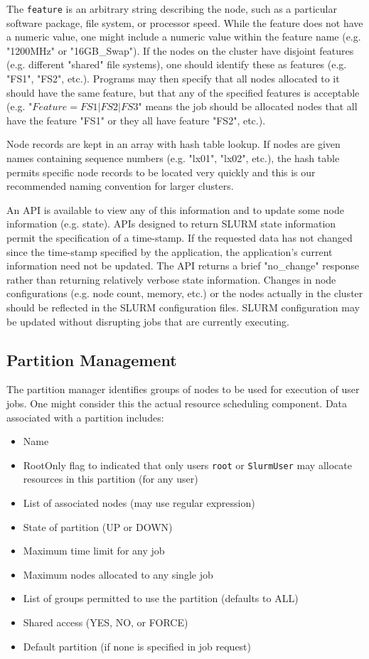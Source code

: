 The {\tt feature} is an arbitrary string describing the node, such as
a particular software package, file system, or processor speed.
While the feature does not have a numeric value, one might include a
numeric value within the feature name (e.g. "1200MHz" or "16GB\_Swap").
If the nodes on the cluster have disjoint features (e.g. different
"shared" file systems), one should identify these as features (e.g. "FS1",
"FS2", etc.).  Programs may then specify that all nodes allocated to it
should have the same feature, but that any of the specified features is
acceptable (e.g. "$Feature=FS1|FS2|FS3$" means the job should be allocated 
nodes that all have the feature "FS1" or they all have feature "FS2", etc.).

Node records are kept in an array with hash table lookup. 
If nodes are given names containing sequence numbers (e.g. "lx01", "lx02", 
etc.), the hash table permits specific node records to be located 
very quickly and this is our recommended naming convention for larger 
clusters.

An API is available to view any of this information and to update some 
node information (e.g. state). APIs designed to return SLURM
state information permit the specification of a time-stamp.  If the
requested data has not changed since the time-stamp specified by the
application, the application's current information need not be updated.
The API returns a brief "no\_change" response rather than returning
relatively verbose state information.
Changes in node configurations (e.g. node count, memory, etc.) or the nodes 
actually in the cluster should be reflected in the SLURM configuration 
files. SLURM configuration may be updated without disrupting jobs 
that are currently executing.

\subsection{Partition Management}

The partition manager identifies groups of nodes to be used for
execution of user jobs. One might consider this the actual resource 
scheduling component. 
Data associated with a partition includes:
\begin{itemize}
\item Name
\item RootOnly flag to indicated that only users {\tt root} or 
{\tt SlurmUser} may allocate resources in this partition (for any user)
\item List of associated nodes (may use regular expression)
\item State of partition (UP or DOWN)
\item Maximum time limit for any job
\item Maximum nodes allocated to any single job
\item List of groups permitted to use the partition (defaults to ALL)
\item Shared access (YES, NO, or FORCE)
\item Default partition (if none is specified in job request)
\end{itemize}

